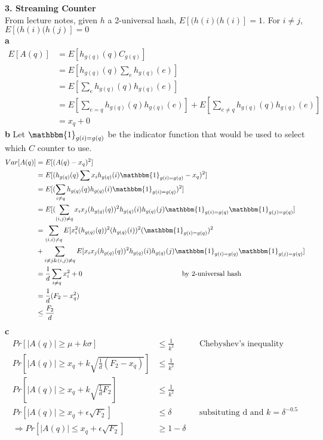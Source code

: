 \documentclass[11pt]{article}
\newcommand{\qpart}[1]{\vspace{0.1cm}\textbf{#1}\\ }
\begin{document}
\qpart{3. Streaming Counter}
From lecture notes, given $h$ a 2-universal hash, $E[(h(i)(h(i)]=1$. For $i\neq j$, $E[(h(i)(h(j)]=0$ \\
\textbf{a}
\begin{align*}
E[A(q)] &= E[h_{g(q)}(q) C_{g(q)}] \\
&= E[h_{g(q)}(q) \sum_e h_{g(q)}(e)] \\
&= E[\sum_e h_{g(q)}(q)h_{g(q)}(e)] \\
&= E[\sum_{e=q} h_{g(q)}(q)h_{g(q)}(e)]+ E[\sum_{e\neq q}h_{g(q)}(q)h_{g(q)}(e)] \\
&=x_q+0
\end{align*}
\textbf{b}
Let $\mathbbm{1}_{g(i)=g(q)}$ be the indicator function that would be used to select which $C$ counter to use.
\begin{align*}
Var[A(q)] &= E[(A(q)-x_q)^2]\\
&= E[(h_{g(q)}(q)\sum x_i h_{g(q)}(i)\mathbbm{1}_{g(i)=g(q)}-x_q)^2]\\
&= E[(\sum_{i\neq q} h_{g(q)}(q)h_{g(q)}(i)\mathbbm{1}_{g(i)=g(q)})^2]\\
&= E[(\sum_{(i,j) \neq q} x_i x_j (h_{g(q)}(q))^2 h_{g(q)}(i) h_{g(q)}(j)\mathbbm{1}_{g(i)=g(q)}\mathbbm{1}_{g(j)=g(q)}]\\
&= \sum_{(i,i) \neq q} E[x^2_i (h_{g(q)}(q))^2 (h_{g(q)}(i))^2 (\mathbbm{1}_{g(i)=g(q)})^2 \\
&+ \sum_{i\neq j \& (i,j) \neq q} E[x_i x_j (h_{g(q)}(q))^2 h_{g(q)}(i) h_{g(q)}(j)\mathbbm{1}_{g(i)=g(q)}\mathbbm{1}_{g(j)=g(q)}]\\
&=\frac{1}{d}\sum_{i\neq q} x_i^2 + 0 \hspace{5cm} \text{by 2-universal hash}\\
&=\frac{1}{d}(F_2 -x_q^2) \\
&\leq \frac{F_2}{d}
\end{align*}
\textbf{c}
\begin{align*}
Pr[|A(q)| \geq \mu + k \sigma ] &\leq \frac{1}{k^2} && \text{Chebyshev's inequality}\\
Pr[|A(q)| \geq x_q + k \sqrt{\frac{1}{d}(F_2-x_q)}] & \leq \frac{1}{k^2} \\
Pr[|A(q)| \geq x_q + k \sqrt{\frac{1}{d}F_2}] & \leq \frac{1}{k^2} \\
Pr[|A(q)| \geq x_q + \epsilon \sqrt{F_2}] &\leq \delta &&\text{subsituting d and $k = \delta^{-0.5}$} \\
\Rightarrow Pr[|A(q)| \leq x_q + \epsilon \sqrt{F_2}] &\geq 1-\delta \\
\end{align*}
\end{document}
